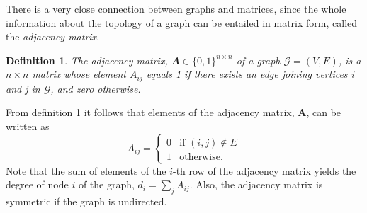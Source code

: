 \documentclass[12pt]{article}
\numberwithin{equation}{section}
\newtheorem{definition}[theorem]{Definition}
\begin{document}

There is a very close connection between graphs and matrices, since the whole information about the topology of a graph can be entailed in matrix form, called the \textsl{adjacency matrix}.
\begin{definition}
	\label{def:adjacencyMatrix}
	The adjacency matrix, $\mathbfit{A} \in \{0,1\}^{n \times n}$ of a graph $\mathcal{G} = (V,E)$, is a $n\times n$ matrix whose element $A_{ij}$ equals 1 if there exists an edge joining vertices i and j in $\mathcal{G}$, and zero otherwise.
\end{definition}
From definition \ref{def:adjacencyMatrix} it follows that elements of the adjacency matrix, $\mathbf{A}$, can be written as
\begin{equation*}
	A_{ij} =
	\begin{cases}
		0 & \text{if } (i,j) \not\in E\\
		1 & \text{otherwise}.
	\end{cases}
\end{equation*}
Note that the sum of elements of the $i$-th row of the adjacency matrix yields the degree of node $i$ of the graph, $d_{i} = \sum\limits_{j} A_{ij}$. Also, the adjacency matrix is symmetric if the graph is undirected.
\end{document}
